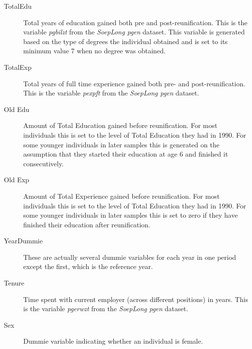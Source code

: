 \documentclass{article}
\begin{document}
\begin{description}
	\item[TotalEdu] Total years of education gained both pre and post-reunification. This is the variable \textit{pgbilzt} from the \textit{SoepLong pgen} dataset. This variable is generated based on the type of degrees the individual obtained and is set to its minimum value 7 when no degree was obtained.
	\item[TotalExp] Total years of full time experience gained both pre- and post-reunification. This is the variable \textit{pexpft} from the \textit{SoepLong pgen} dataset.
	\item[Old Edu] Amount of Total Education gained before reunification. For most individuals this is set to the level of Total Education they had in 1990. For some younger individuals in later samples this is generated on the assumption that they started their education at age 6 and finished it consecutively.
	\item[Old Exp] Amount of Total Experience gained before reunification. For most individuals this is set to the level of Total Education they had in 1990. For some younger individuals in later samples this is set to zero if they have finished their education after reunification.
	\item[YearDummie] These are actually several dummie variables for each year in one period except the first, which is the reference year.
	\item[Tenure] Time spent with current employer (across different positions) in years. This is the variable \textit{pgerwzt} from the \textit{SoepLong pgen} dataset.
	\item[Sex] Dummie variable indicating whether an individual is female. 
	 
	
\end{description}
\end{document}
